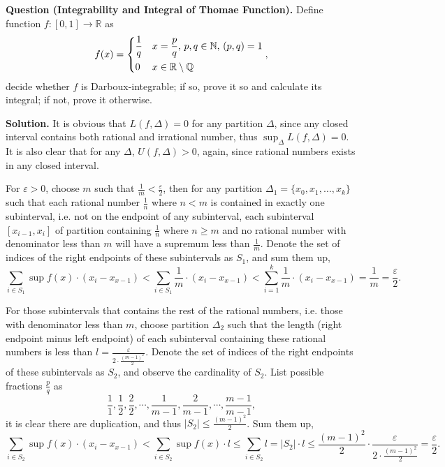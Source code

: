 \documentclass[10pt]{article}
\begin{document}
\begin{CJK*}{UTF8}{gbsn}
\newpage
\textbf{Question (Integrability and Integral of Thomae Function).} Define function $f:[0,1]\to\mathbb{R}$ as
\begin{align*}
f(x)=\begin{dcases}
\frac{1}{q}&x=\frac{p}{q},\,p,q\in\mathbb{N},\,(p,q)=1\\
0&x\in\mathbb{R}\setminus\mathbb{Q}
\end{dcases},
\end{align*}
decide whether $f$ is Darboux-integrable; if so, prove it so and calculate its integral; if not, prove it otherwise.

\textbf{Solution.} It is obvious that $L(f,\Delta)=0$ for any partition $\Delta$, since any closed interval contains both rational and irrational number, thus $\displaystyle\sup_\Delta L(f,\Delta)=0$. It is also clear that for any $\Delta$, $U(f,\Delta)>0$, again, since rational numbers exists in any closed interval.

For $\varepsilon>0$, choose $m$ such that $\frac{1}{m}<\frac{\varepsilon}{2}$, then for any partition $\Delta_1=\{x_0,x_1,\dots,x_k\}$ such that each rational number $\frac{1}{n}$ where $n<m$ is contained in exactly one subinterval, i.e. not on the endpoint of any subinterval, each subinterval $[x_{i-1},x_i]$ of partition containing $\frac{1}{n}$ where $n\geq m$ and no rational number with denominator less than $m$ will have a supremum less than $\frac{1}{m}$. Denote the set of indices of the right endpoints of these subintervals as $S_1$, and sum them up,
$$
\sum_{i\in S_1}\sup f(x)\cdot(x_i-x_{x-1})<\sum_{i\in S_1}\frac{1}{m}\cdot(x_i-x_{x-1})<\sum_{i=1}^k\frac{1}{m}\cdot(x_i-x_{x-1})=\frac{1}{m}=\frac{\varepsilon}{2}.
$$

For those subintervals that contains the rest of the rational numbers, i.e. those with denominator less than $m$, choose partition $\Delta_2$ such that the length (right endpoint minus left endpoint) of each subinterval containing these rational numbers is less than $\displaystyle l=\frac{\varepsilon}{2\cdot\frac{(m-1)^2}{2}}$. Denote the set of indices of the right endpoints of these subintervals as $S_2$, and observe the cardinality of $S_2$. List possible fractions $\frac{p}{q}$ as
$$
\frac{1}{1},\frac{1}{2},\frac{2}{2},\cdots,\frac{1}{m-1},\frac{2}{m-1},\cdots,\frac{m-1}{m-1},
$$
it is clear there are duplication, and thus $|S_2|\leq\frac{(m-1)^2}{2}$. Sum them up,
$$
\sum_{i\in S_2}\sup f(x)\cdot(x_i-x_{x-1})<\sum_{i\in S_2}\sup f(x)\cdot l\leq\sum_{i\in S_2}l=|S_2|\cdot l\leq\frac{(m-1)^2}{2}\cdot\frac{\varepsilon}{2\cdot\frac{(m-1)^2}{2}}=\frac{\varepsilon}{2}.
$$


\end{CJK*}
\end{document}
